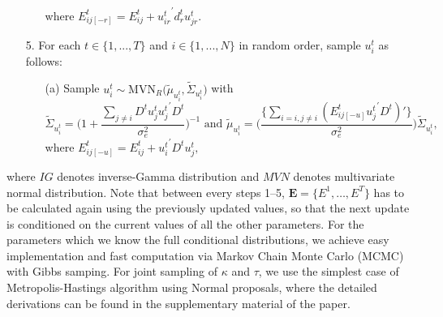 \documentclass[a4paper]{article}
\begin{document}
\begin{itemize}
\begin{enumerate}
			where $E^{t}_{ij[-r]}=E^t_{ij}+{u^t_{ir}}^\prime d^t_{r}u^t_{jr}$.
		\end{enumerate}		
		\item [5.] For each $t \in \{1,...,T\}$ and $i \in \{1,...,N\}$ in random order, sample $u^t_{i}$ as follows:
		\begin{enumerate}
					\item [(a)] Sample $u^t_{i}\sim \mbox{MVN}_R\big(\tilde{\mu}_{u^t_{i}}, \tilde{\Sigma}_{u^t_{i}} \big)$ with 
			$$\tilde{\Sigma}_{u^t_{i}} = \Big(1+\frac{\sum_{j\neq i}D^tu^t_{j}{u^t_{j}}^\prime D^t}{\sigma_e^2}\Big)^{-1}\mbox{ and } \tilde{\mu}_{u^t_{i}} = \Big(\frac{\{\sum_{i=i, j\neq i}(E^{t}_{ij[-u]}{u^t_{j}}^\prime D^t)'\}}{{\sigma_e^2}}\Big)\tilde{\Sigma}_{u^t_{i}},$$ 
			where $E^{t}_{ij[-u]}=E^t_{ij}+{u^t_{i}}^\prime D^tu^t_{j},$
		\end{enumerate}			
	\end{itemize}
	where $IG$ denotes inverse-Gamma distribution and $MVN$ denotes multivariate normal distribution.
	Note that between every steps 1--5, $\mathbf{E} = \{E^1,\ldots, E^T\}$ has to be calculated again using the previously updated values, so that the next update is conditioned on the current values of all the other parameters. For the parameters which we know the full conditional distributions, we achieve easy implementation and fast computation via Markov Chain Monte Carlo (MCMC) with Gibbs samping. For joint sampling of $\kappa$ and $\tau$, we use the simplest case of Metropolis-Hastings algorithm using Normal proposals, where the detailed derivations can be found in the supplementary material of the paper.
\end{document}

